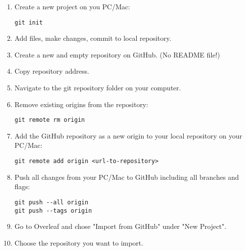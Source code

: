 \documentclass{article}
\begin{document}
\begin{enumerate}
    \item Create a new project on you PC/Mac:
    \begin{verbatim}
git init
    \end{verbatim}
    \item Add files, make changes, commit to local repository.
    \item Create a new and empty repository on GitHub. (No README file!)
    \item Copy repository address.
    \item Navigate to the git repository folder on your computer. 
    \item Remove existing origins from the repository:
    \begin{verbatim}
git remote rm origin
    \end{verbatim}
    \item Add the GitHub repository as a new origin to your local repository on your PC/Mac:
    \begin{verbatim}
git remote add origin <url-to-repository>
    \end{verbatim}
    \item Push all changes from your PC/Mac to GitHub including all branches and flags:
    \begin{verbatim}
git push --all origin
git push --tags origin
    \end{verbatim}
    \item Go to Overleaf and chose "Import from GitHub" under "New Project".
    \item Choose the repository you want to import.
\end{enumerate}
\end{document}
